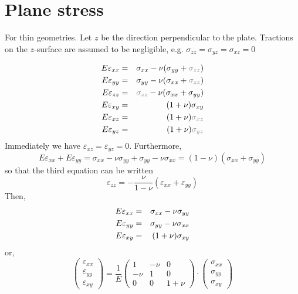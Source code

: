 \section{Plane stress}

For thin geometries. Let $z$ be the direction perpendicular to the plate.
Tractions  on the $z$-surface are assumed to be negligible, e.g.
$\sigma_{zz}=\sigma_{yz}=\sigma_{xz}=0$

\begin{eqnarray}
E \varepsilon_{xx} &=&  \sigma_{xx} - \nu (\sigma_{yy}+{\color{gray}\sigma_{zz}}) \nn\\
E \varepsilon_{yy} &=&  \sigma_{yy} - \nu (\sigma_{xx}+{\color{gray}\sigma_{zz}}) \nn\\
E \varepsilon_{zz} &=&  {\color{gray}\sigma_{zz}} - \nu (\sigma_{xx}+\sigma_{yy}) \nn\\
E \varepsilon_{xy} &=&  (1+\nu) \sigma_{xy} \nn\\
E \varepsilon_{xz} &=&  (1+\nu) {\color{gray}\sigma_{xz}} \nn\\
E \varepsilon_{yz} &=&  (1+\nu) {\color{gray}\sigma_{yz}} \nn 
\end{eqnarray}
Immediately we have $\varepsilon_{xz}=\varepsilon_{yz}=0$.
Furthermore, 
\[
E\varepsilon_{xx}+E\varepsilon_{yy} =  \sigma_{xx} - \nu \sigma_{yy} +  \sigma_{yy} - \nu \sigma_{xx} = (1-\nu)(\sigma_{xx}+\sigma_{yy})
\]
so that the third equation can be written
\[
\varepsilon_{zz} = -\frac{\nu}{1-\nu} ( \varepsilon_{xx}+\varepsilon_{yy})
\]
Then, 
\begin{eqnarray}
E \varepsilon_{xx} &=&  \sigma_{xx} - \nu \sigma_{yy} \nonumber\\
E \varepsilon_{yy} &=&  \sigma_{yy} - \nu \sigma_{xx} \nonumber\\
E \varepsilon_{xy} &=&  (1+\nu) \sigma_{xy} 
\end{eqnarray}
or,
\begin{equation}
\left(
\begin{array}{c}
\varepsilon_{xx}\\
\varepsilon_{yy}\\
\varepsilon_{xy}
\end{array}
\right)
=\frac1E
\left(
\begin{array}{ccc}
1 & -\nu & 0 \\
-\nu & 1 & 0 \\
0 & 0 & 1+\nu
\end{array}
\right)
\cdot
\left(
\begin{array}{c}
\sigma_{xx}\\
\sigma_{yy}\\
\sigma_{xy}
\end{array}
\right)
\end{equation}
